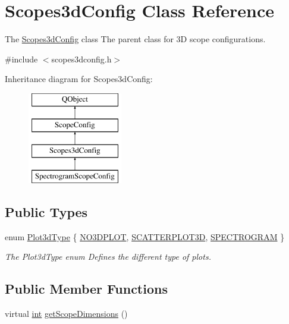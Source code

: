 \hypertarget{class_scopes3d_config}{\section{Scopes3d\-Config Class Reference}
\label{class_scopes3d_config}
}


The \hyperlink{class_scopes3d_config}{Scopes3d\-Config} class The parent class for 3\-D scope configurations.  




{\ttfamily \#include $<$scopes3dconfig.\-h$>$}

Inheritance diagram for Scopes3d\-Config\-:\begin{figure}[H]
\begin{center}
\leavevmode
\includegraphics[height=4.000000cm]{class_scopes3d_config}
\end{center}
\end{figure}
\subsection*{Public Types}
\begin{DoxyCompactItemize}
\item 
enum \hyperlink{group___scope_plugin_ga50e7b7155f87047a171af78191828496}{Plot3d\-Type} \{ \hyperlink{group___scope_plugin_gga50e7b7155f87047a171af78191828496ae3b1069e4985d5e50337e7bd39969e74}{N\-O3\-D\-P\-L\-O\-T}, 
\hyperlink{group___scope_plugin_gga50e7b7155f87047a171af78191828496a48fce9291e9e40ea180ad0d14f5bce39}{S\-C\-A\-T\-T\-E\-R\-P\-L\-O\-T3\-D}, 
\hyperlink{group___scope_plugin_gga50e7b7155f87047a171af78191828496a84544a635d05fc1c4c6a7a273653d59e}{S\-P\-E\-C\-T\-R\-O\-G\-R\-A\-M}
 \}
\begin{DoxyCompactList}\small\item\em The Plot3d\-Type enum Defines the different type of plots. \end{DoxyCompactList}\end{DoxyCompactItemize}
\subsection*{Public Member Functions}
\begin{DoxyCompactItemize}
\item 
virtual \hyperlink{ioapi_8h_a787fa3cf048117ba7123753c1e74fcd6}{int} \hyperlink{group___scope_plugin_ga19f02e368a922611f86005f7e18f12bf}{get\-Scope\-Dimensions} ()
\end{DoxyCompactItemize}
